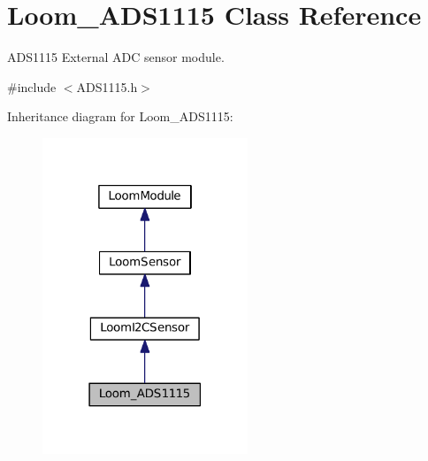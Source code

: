 \hypertarget{class_loom___a_d_s1115}{}\section{Loom\+\_\+\+A\+D\+S1115 Class Reference}
\label{class_loom___a_d_s1115}


A\+D\+S1115 External A\+DC sensor module.  




{\ttfamily \#include $<$A\+D\+S1115.\+h$>$}



Inheritance diagram for Loom\+\_\+\+A\+D\+S1115\+:\nopagebreak
\begin{figure}[H]
\begin{center}
\leavevmode
\includegraphics[width=174pt]{class_loom___a_d_s1115__inherit__graph}
\end{center}
\end{figure}
